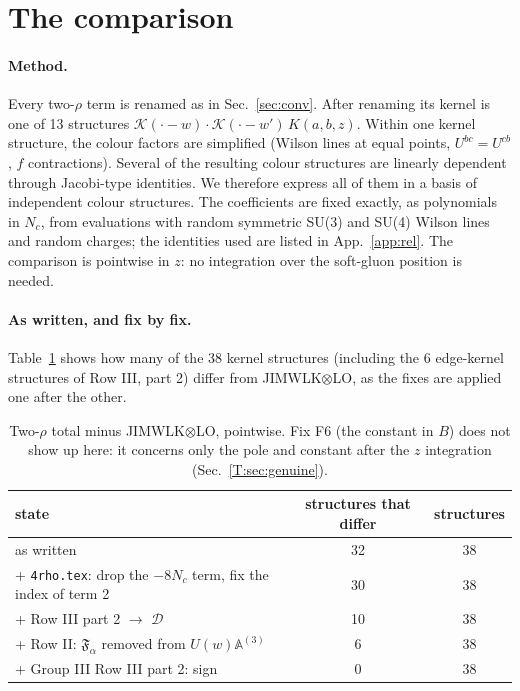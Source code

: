 \documentclass[10pt]{article}
\numberwithin{equation}{section}
\newcommand{\KK}{\mathcal K}
\begin{document}
\section{The comparison}\label{T:sec:match}
\paragraph{Method.} Every two-$\rho$ term is renamed as in Sec.~\ref{sec:conv}. After renaming its kernel is one of 13 structures $\KK(\cdot-w)\cdot\KK(\cdot-w')\,K(a,b,z)$. Within one kernel structure, the colour factors are simplified (Wilson lines at equal points, $U^{bc}=U^{cb}$, $f$ contractions). Several of the resulting colour structures are linearly dependent through Jacobi-type identities. We therefore express all of them in a basis of independent colour structures. The coefficients are fixed exactly, as polynomials in $N_c$, from evaluations with random symmetric SU(3) and SU(4) Wilson lines and random charges; the identities used are listed in App.~\ref{app:rel}. The comparison is pointwise in $z$: no integration over the soft-gluon position is needed.

\paragraph{As written, and fix by fix.} Table~\ref{T:tab:states} shows how many of the 38 kernel structures (including the 6 edge-kernel structures of Row III, part 2) differ from JIMWLK$\otimes$LO, as the fixes are applied one after the other.
\begin{table}[h]
\centering\small
\begin{tabular}{@{}l c c@{}}
state & structures that differ & structures\\ \hline
as written & 32 & 38 \\
+ \texttt{4rho.tex}: drop the $-8N_c$ term, fix the index of term 2 & 30 & 38 \\
+ Row III part 2 $\to$ $\mathcal D$ & 10 & 38 \\
+ Row II: $\mathfrak F_\alpha$ removed from $U(w)\mathbb A^{(3)}$ & 6 & 38 \\
+ Group III Row III part 2: sign & 0 & 38 \\
\end{tabular}
\caption{Two-$\rho$ total minus JIMWLK$\otimes$LO, pointwise. Fix F6 (the constant in $B$) does not show up here: it concerns only the pole and constant after the $z$ integration (Sec.~\ref{T:sec:genuine}).}
\label{T:tab:states}
\end{table}
\end{document}
